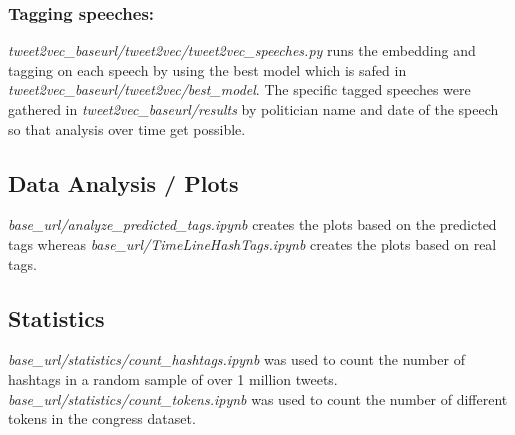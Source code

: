 \documentclass[10pt,conference,compsocconf]{IEEEtran}
\begin{document}
\subsubsection{Tagging speeches:}
\textit{tweet2vec\_baseurl/tweet2vec/tweet2vec\_speeches.py} runs the embedding and tagging on each speech by using the best model which is safed in \textit{tweet2vec\_baseurl/tweet2vec/best\_model}. The specific tagged speeches were gathered in \textit{tweet2vec\_baseurl/results} by politician name and date of the speech so that analysis over time get possible.

\subsection{Data Analysis / Plots}
 \textit{base\_url/analyze\_predicted\_tags.ipynb} creates the plots based on the predicted tags whereas  \textit{base\_url/TimeLineHashTags.ipynb} creates the plots based on real tags. 
 
\subsection{Statistics}
\textit{base\_url/statistics/count\_hashtags.ipynb} was used to count the number of hashtags in a random sample of over 1 million tweets. 
\textit{base\_url/statistics/count\_tokens.ipynb} was used to count the number of different tokens in the congress dataset. 






\end{document}
